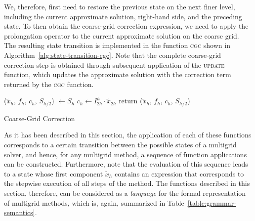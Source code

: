 We, therefore, first need to restore the previous state on the next finer level, including the current approximate solution, right-hand side, and the preceding state.
To then obtain the coarse-grid correction expression, we need to apply the prolongation operator to the current approximate solution on the coarse grid.
The resulting state transition is implemented in the function \textsc{cgc} shown in Algorithm~\ref{alg:state-transition-cgc}.
Note that the complete coarse-grid correction step is obtained through subsequent application of the \textsc{update} function, which updates the approximate solution with the correction term returned by the \textsc{cgc} function.
\begin{algorithm}
	\begin{algorithmic}
		\State ($\tilde{x}_h$, $f_{h}$, $c_h$, $S_{h/2}$) $\gets S_{h}$
		\State $c_h \gets I_{2h}^{h} \cdot \tilde{x}_{2h}$
		\State return ($\tilde{x}_h$, $f_{h}$, $c_h$, $S_{h/2}$)
		\EndFunction
	\end{algorithmic}
 \label{alg:state-transition-cgc}
\caption{Coarse-Grid Correction}

\end{algorithm}
As it has been described in this section, the application of each of these functions corresponds to a certain transition between the possible states of a multigrid solver, and hence, for any multigrid method, a sequence of function applications can be constructed.
Furthermore, note that the evaluation of this sequence leads to a state whose first component $\tilde{x}_h$ contains an expression that corresponds to the stepwise execution of all steps of the method.
The functions described in this section, therefore, can be considered as a \emph{language} for the formal representation of multigrid methods, which is, again, summarized in Table~\ref{table:grammar-semantics}.
